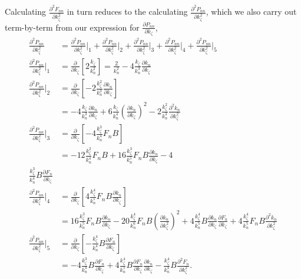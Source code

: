 \documentclass{article}
\begin{document}
Calculating $\frac{\partial^2 F_{nn}}{\partial k_{\zeta}^2}$ in turn reduces to the calculating $\frac{\partial^2 P_{nn}}{\partial k_{\zeta}^2}$, which we also carry out term-by-term from our expression for $\frac{\partial P_{nn}}{\partial k_{\zeta}}$,
\begin{align}
\frac{\partial^2 P_{nn}}{\partial k_{\zeta}^2} &= \frac{\partial^2 P_{nn}}{\partial k_{\zeta}^2}\bigg|_{1} + \frac{\partial^2 P_{nn}}{\partial k_{\zeta}^2}\bigg|_{2} + \frac{\partial^2 P_{nn}}{\partial k_{\zeta}^2}\bigg|_{3} + \frac{\partial^2 P_{nn}}{\partial k_{\zeta}^2}\bigg|_{4} + \frac{\partial^2 P_{nn}}{\partial k_{\zeta}^2}\bigg|_{5} \\
\frac{\partial^2 P_{nn}}{\partial k_{\zeta}^2}\bigg|_{1} &= \frac{\partial}{\partial k_{\zeta}} \left[2 \frac{k_{\zeta}}{k_{n}^2} \right] = \frac{2}{k_{n}^2} - 4 \frac{k_{\zeta}}{k_{n}^3} \frac{\partial k_{n}}{\partial k_{\zeta}} \\
\frac{\partial^2 P_{nn}}{\partial k_{\zeta}^2}\bigg|_{2} &= \frac{\partial}{\partial k_{\zeta}} \left[-2 \frac{k_{\zeta}^2}{k_{n}^3} \frac{\partial k_{n}}{\partial k_{\zeta}} \right] \\
&= - 4 \frac{k_{\zeta}}{k_{n}^3} \frac{\partial k_{n}}{\partial k_{\zeta}} + 6 \frac{k_{\zeta}}{k_{n}^4} \left(\frac{\partial k_{n}}{\partial k_{\zeta}} \right)^2 - 2 \frac{k_{\zeta}^2}{k_{n}^3} \frac{\partial^2 k_{n}}{\partial k_{\zeta}^2} \\
\frac{\partial^2 P_{nn}}{\partial k_{\zeta}^2}\bigg|_{3} &= \frac{\partial}{\partial k_{\zeta}} \left[-4 \frac{k_{\zeta}^3}{k_{n}^4} F_{n} B \right] \\
&= -12 \frac{k_{\zeta}^2}{k_{n}^4} F_{n} B + 16 \frac{k_{\zeta}^3}{k_{n}^5} F_{n} B \frac{\partial k_{n}}{\partial k_{\zeta}} - 4 \\
\frac{k_{\zeta}^3}{k_{n}^4} B \frac{\partial F_{n}}{\partial k_{\zeta}} \\
\frac{\partial^2 P_{nn}}{\partial k_{\zeta}^2}\bigg|_{4} &= \frac{\partial}{\partial k_{\zeta}} \left[ 4 \frac{k_{\zeta}^4}{k_{n}^5} F_{n} B \frac{\partial k_{n}}{\partial k_{\zeta}} \right] \\
&= 16 \frac{k_{\zeta}^3}{k_{n}^5} F_{n} B \frac{\partial k_{n}}{\partial k_{\zeta}} - 20 \frac{k_{\zeta}^4}{k_{n}^6} F_{n} B \left( \frac{\partial k_{n}}{\partial k_{\zeta}^2} \right)^2 + 4 \frac{k_{\zeta}^4}{k_{n}^5} B \frac{\partial k_{n}}{\partial k_{\zeta}} \frac{\partial F_{n}}{\partial k_{\zeta}} + 4 \frac{k_{\zeta}^4}{k_{n}^5} F_{n} B \frac{\partial^2 k_{n}}{\partial k_{\zeta}^2} \\
\frac{\partial^2 P_{nn}}{\partial k_{\zeta}^2}\bigg|_{5} &= \frac{\partial}{\partial k_{\zeta}} \left[ - \frac{k_{\zeta}^4}{k_{n}^4} B \frac{\partial F_{n}}{\partial k_{\zeta}} \right] \\
&= -4 \frac{k_{\zeta}^3}{k_{n}^4} B \frac{\partial F_{n}}{\partial k_{\zeta}} + 4 \frac{k_{\zeta}^4}{k_{n}^5} B \frac{\partial F_{n}}{\partial k_{\zeta}} \frac{\partial k_{n}}{\partial k_{\zeta}} - \frac{k_{\zeta}^4}{k_{n}^4} B \frac{\partial^2 F_{n}}{\partial k_{\zeta}^2}.
\end{align}
\end{document}
